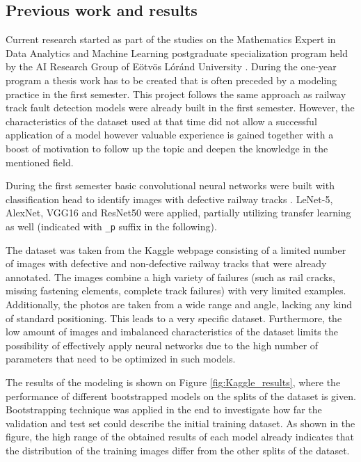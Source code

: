 \subsection{Previous work and results}
Current research started as part of the studies on the Mathematics Expert in
Data Analytics and Machine Learning postgraduate specialization program \cite{_ai&ml_}
held by the AI Research Group of Eötvös Lóránd University \cite{_ai_}.
During the one-year program a thesis work has to be created that is often
preceded by a modeling practice in the first semester.
This project follows the same approach as railway track fault detection models
were already built in the first semester.
However, the characteristics of the dataset used at that time did not allow a
successful application of a model however valuable experience is gained together
with a boost of motivation to follow up the topic and deepen the knowledge in the
mentioned field.

During the first semester basic convolutional neural networks were built with classification
head to identify images with defective railway tracks \cite{tomcom_mathemathical_2022}.
LeNet-5, AlexNet, VGG16 and ResNet50 were applied, partially utilizing transfer learning as well
(indicated with \lstinline{_p} suffix in the following).

The dataset was taken from the Kaggle webpage \cite{_railway_} consisting of a limited
number of images with defective and non-defective railway tracks that were already annotated.
The images combine a high variety of failures (such as rail cracks, missing fastening elements,
complete track failures) with very limited examples.
Additionally, the photos are taken from a wide range and angle, lacking any kind of standard positioning.
This leads to a very specific dataset.
Furthermore, the low amount of images and imbalanced characteristics of the dataset limits
the possibility of effectively apply neural networks due to the high number of parameters
that need to be optimized in such models.

The results of the modeling is shown on Figure \ref{fig:Kaggle_results}, where the performance of
different bootstrapped models on the splits of the dataset is given.
Bootstrapping technique was applied in the end to investigate how far the validation and test set could
describe the initial training dataset.
As shown in the figure, the high range of the obtained results of each model already indicates
that the distribution of the training images differ from the other splits of the dataset.


